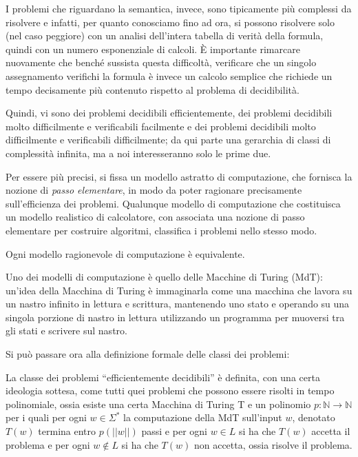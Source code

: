 I problemi che riguardano la semantica, invece, sono tipicamente più complessi
da risolvere e infatti, per quanto conosciamo fino ad ora, si possono risolvere 
solo (nel caso peggiore) con un analisi dell'intera tabella di verità della 
formula, quindi con un numero esponenziale di calcoli. \`E importante rimarcare 
nuovamente che benché sussista questa difficoltà, verificare che 
un singolo assegnamento verifichi la formula è invece un calcolo semplice 
che richiede un tempo decisamente più contenuto rispetto al problema di 
decidibilità.

Quindi, vi sono dei problemi decidibili efficientemente, 
dei problemi decidibili molto difficilmente e verificabili facilmente 
e dei problemi decidibili molto difficilmente e verificabili difficilmente; 
da qui parte una gerarchia di classi di complessità infinita, ma a noi interesseranno 
solo le prime due. 
 
Per essere più precisi, si fissa un modello astratto di computazione, che fornisca 
la nozione di \textit{passo elementare}, in modo da poter ragionare precisamente 
sull'efficienza dei problemi. 
Qualunque modello di computazione che costituisca un modello realistico 
di calcolatore, con associata una nozione di passo elementare per costruire 
algoritmi, classifica i problemi nello stesso modo. 

\begin{oss}
  Ogni modello ragionevole di computazione è equivalente.
\end{oss}

Uno dei modelli di computazione è quello delle Macchine di Turing (MdT): un'idea 
della Macchina di Turing è immaginarla come una macchina che lavora su un 
nastro infinito in lettura e scrittura, mantenendo uno stato e operando su 
una singola porzione di nastro in lettura utilizzando un programma per 
muoversi tra gli stati e scrivere sul nastro. 

Si può passare ora alla definizione formale delle classi dei problemi: 
\begin{defi}
  La classe dei problemi ``efficientemente decidibili'' è definita, con una 
  certa ideologia sottesa, come tutti quei problemi che possono essere 
  risolti in tempo polinomiale, ossia esiste una certa Macchina di Turing T 
  e un polinomio $p: \mathbb{N}\rightarrow \mathbb{N}$ per i quali per ogni 
  $w \in \Sigma^*$  la computazione della MdT sull'input $w$, 
  denotato $T(w)$ termina entro $p(||w||)$ passi e per ogni $w \in L$ si 
  ha che $T(w)$ accetta il problema e per ogni $w \notin L$  si ha 
  che $T(w)$ non accetta, ossia risolve il problema.
\end{defi}

